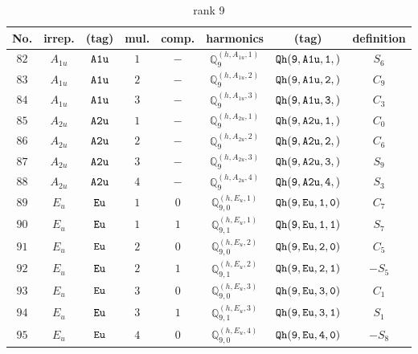 \documentclass[fleqn,8pt]{jsarticle}
\begin{document}
\begin{table}[ht!]
\begin{center}
\caption{rank 9}
\renewcommand{\arraystretch}{1.3}
\begin{tabular}{cccccccc} \hline \hline
No. & irrep. & (tag) & mul. & comp. & harmonics & (tag) & definition \\ \hline
$ 82 $ & $ A_{1u} $ & $ {\tt A1u} $ & $ 1 $ & $ - $ & $ \mathbb{Q}_{9}^{(h,A_{1u},1)} $ & $ {\tt Qh(9,A1u,1,)} $ & $ S_{6} $ \\
$ 83 $ & $ A_{1u} $ & $ {\tt A1u} $ & $ 2 $ & $ - $ & $ \mathbb{Q}_{9}^{(h,A_{1u},2)} $ & $ {\tt Qh(9,A1u,2,)} $ & $ C_{9} $ \\
$ 84 $ & $ A_{1u} $ & $ {\tt A1u} $ & $ 3 $ & $ - $ & $ \mathbb{Q}_{9}^{(h,A_{1u},3)} $ & $ {\tt Qh(9,A1u,3,)} $ & $ C_{3} $ \\
$ 85 $ & $ A_{2u} $ & $ {\tt A2u} $ & $ 1 $ & $ - $ & $ \mathbb{Q}_{9}^{(h,A_{2u},1)} $ & $ {\tt Qh(9,A2u,1,)} $ & $ C_{0} $ \\
$ 86 $ & $ A_{2u} $ & $ {\tt A2u} $ & $ 2 $ & $ - $ & $ \mathbb{Q}_{9}^{(h,A_{2u},2)} $ & $ {\tt Qh(9,A2u,2,)} $ & $ C_{6} $ \\
$ 87 $ & $ A_{2u} $ & $ {\tt A2u} $ & $ 3 $ & $ - $ & $ \mathbb{Q}_{9}^{(h,A_{2u},3)} $ & $ {\tt Qh(9,A2u,3,)} $ & $ S_{9} $ \\
$ 88 $ & $ A_{2u} $ & $ {\tt A2u} $ & $ 4 $ & $ - $ & $ \mathbb{Q}_{9}^{(h,A_{2u},4)} $ & $ {\tt Qh(9,A2u,4,)} $ & $ S_{3} $ \\
$ 89 $ & $ E_{u} $ & $ {\tt Eu} $ & $ 1 $ & $ 0 $ & $ \mathbb{Q}_{9,0}^{(h,E_{u},1)} $ & $ {\tt Qh(9,Eu,1,0)} $ & $ C_{7} $ \\
$ 90 $ & $ E_{u} $ & $ {\tt Eu} $ & $ 1 $ & $ 1 $ & $ \mathbb{Q}_{9,1}^{(h,E_{u},1)} $ & $ {\tt Qh(9,Eu,1,1)} $ & $ S_{7} $ \\
$ 91 $ & $ E_{u} $ & $ {\tt Eu} $ & $ 2 $ & $ 0 $ & $ \mathbb{Q}_{9,0}^{(h,E_{u},2)} $ & $ {\tt Qh(9,Eu,2,0)} $ & $ C_{5} $ \\
$ 92 $ & $ E_{u} $ & $ {\tt Eu} $ & $ 2 $ & $ 1 $ & $ \mathbb{Q}_{9,1}^{(h,E_{u},2)} $ & $ {\tt Qh(9,Eu,2,1)} $ & $ - S_{5} $ \\
$ 93 $ & $ E_{u} $ & $ {\tt Eu} $ & $ 3 $ & $ 0 $ & $ \mathbb{Q}_{9,0}^{(h,E_{u},3)} $ & $ {\tt Qh(9,Eu,3,0)} $ & $ C_{1} $ \\
$ 94 $ & $ E_{u} $ & $ {\tt Eu} $ & $ 3 $ & $ 1 $ & $ \mathbb{Q}_{9,1}^{(h,E_{u},3)} $ & $ {\tt Qh(9,Eu,3,1)} $ & $ S_{1} $ \\
$ 95 $ & $ E_{u} $ & $ {\tt Eu} $ & $ 4 $ & $ 0 $ & $ \mathbb{Q}_{9,0}^{(h,E_{u},4)} $ & $ {\tt Qh(9,Eu,4,0)} $ & $ - S_{8} $ \\

\end{tabular}
\end{center}
\end{table}
\end{document}
